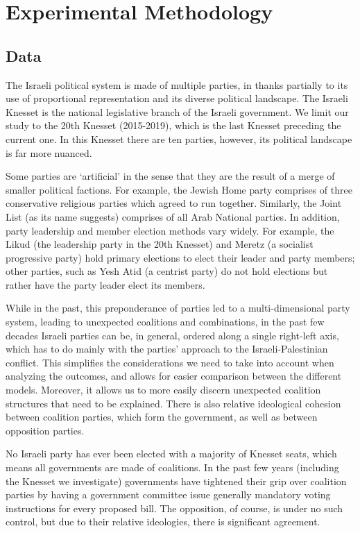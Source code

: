 
\chapter{Experimental Methodology}
\label{ch:experiment}

\section{Data}
\label{sec:data}

The Israeli political system is made of multiple parties, in thanks partially to its use of
proportional representation and its diverse political landscape.
The Israeli Knesset is the national legislative branch of the Israeli government.
We limit our study to the 20th Knesset (2015-2019), which is the last
Knesset preceding the current one.
In this Knesset there are ten parties, however, its political landscape is far more nuanced.

Some parties are `artificial' in the sense that they are the result of a merge
of smaller political factions.
For example, the Jewish Home party comprises of three conservative religious
parties which agreed to run together.
Similarly, the Joint List (as its name suggests) comprises of all Arab National
parties. 
In addition, party leadership and member election methods vary widely.
For example, the Likud (the leadership party in the 20th Knesset) and Meretz
(a socialist progressive party) hold primary elections to elect their leader
and party members; other parties, such as Yesh Atid (a centrist party) do not
hold elections but rather have the party leader elect its members. 

While in the past, this preponderance of parties led to a multi-dimensional
party system, leading to unexpected coalitions and combinations,
in the past few decades Israeli parties can be, in general,
ordered along a single right-left axis, which has to do mainly with
the parties' approach to the Israeli-Palestinian conflict.
This simplifies the considerations we need to take into account when analyzing
the outcomes, and allows for easier comparison between the different models.
Moreover, it allows us to more easily discern
unexpected coalition structures that need to be explained.
There is also relative ideological cohesion between coalition parties, which
form the government, as well as between opposition parties.

No Israeli party has ever been elected with a majority of Knesset seats,
which means all governments are made of coalitions.
In the past few years (including the Knesset we investigate)
governments have tightened their grip over coalition parties by having a government committee issue generally mandatory
voting instructions for every proposed bill.
The opposition, of course, is under no such control,
but due to their relative ideologies, there is significant agreement.

